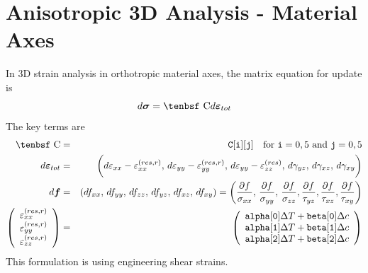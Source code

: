 \documentclass[11pt]{book}
\renewcommand{\vec}[1]{\boldsymbol{#1}}
\def\C{\hbox{\tenbsf C}}
\def\code#1{{\small\tt #1}}
\def\deff{d \vec{\varepsilon}_{tot}}
\def\df{d \vec{f}}
\def\dsig{d \vec{\sigma}}
\def\DT{\Delta T}
\def\e#1{\varepsilon_{#1}}
\def\er#1{\varepsilon_{#1}^{(res)}}
\def\err#1{\varepsilon_{#1}^{(res,r)}}
\def\g#1{\gamma_{#1}}
\begin{document}
\section{Anisotropic 3D Analysis - Material Axes}

In 3D strain analysis in orthotropic material axes, the matrix equation for update is
\begin{equation}
    \dsig = \C \deff 
\end{equation}
The key terms are
\begin{eqnarray}
      \C & = & \code{C[i][j]} \quad {\rm for\ }\code{i}=0,5\ {\rm and\ }\code{j}=0,5 \\
       \deff & = & \biggl(d\e{xx} - \err{xx}, \thinspace d\e{yy} - \err{yy}, \thinspace  d\e{yy}-  \er{zz}, 
             \thinspace d\g{yz}, \thinspace d\g{xz},  \thinspace d\g{xy}\biggr) \\
      \df & = & (df_{xx}, \thinspace df_{yy}, \thinspace df_{zz}, \thinspace df_{yz}, \thinspace df_{xz}, \thinspace df_{xy})
                  = \left({\partial f\over \sigma_{xx}}, \thinspace {\partial f\over \sigma_{yy}}, \thinspace {\partial f\over \sigma_{zz}},
                                {\partial f\over \tau_{yz}}, {\partial f\over \tau_{xz}}, {\partial f\over \tau_{xy}}\right)  \\
\left(\begin{array}{c} \err{xx} \\ \err{yy} \\ \err{zz}  \end{array}\right)
       & = &  \left(\begin{array}{c}
	\code{alpha[0]}\DT + \code{beta[0]}\Delta c \\
	\code{alpha[1]}\DT + \code{beta[1]}\Delta c \\
	\code{alpha[2]}\DT + \code{beta[2]}\Delta c \\
 \end{array}\right) 
 \end{eqnarray}
This formulation is using engineering shear strains. 
 
\end{document}
